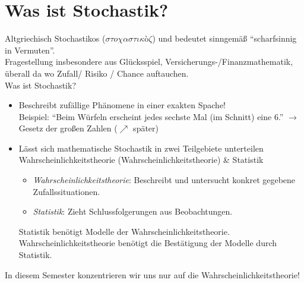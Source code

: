 \chapter*{Was ist Stochastik?}

Altgriechisch Stochastikos ($\sigma \tau o \chi \alpha \sigma \tau \iota \kappa$\`{o}$ \zeta$) und bedeutet sinngemäß ``scharfsinnig in Vermuten''.\\
Fragestellung insbesondere aus Glücksspiel, Versicherungs-/Finanzmathematik, überall da wo Zufall/ Risiko / Chance auftauchen.\\
Was ist Stochastik?
\begin{itemize}
	\item Beschreibt zufällige Phänomene in einer exakten Spache!\\
	Beispiel: ``Beim Würfeln erscheint jedes sechste Mal (im Schnitt) eine 6.'' $\longrightarrow$ Gesetz der großen Zahlen ($\nearrow$ später) %
	\item Lässt sich mathematische Stochastik in zwei Teilgebiete unterteilen\\
	Wahrscheinlichkeitstheorie (Wahrscheinlichkeitstheorie) \& Statistik
	\begin{itemize}
		\item \textit{Wahrscheinlichkeitstheorie}: Beschreibt und untersucht konkret gegebene Zufallssituationen.
		\item \textit{Statistik}: Zieht Schlussfolgerungen aus Beobachtungen.
	\end{itemize}
	Statistik benötigt Modelle der Wahrscheinlichkeitstheorie. Wahrscheinlichkeitstheorie benötigt die Bestätigung der Modelle durch Statistik.
\end{itemize}
In diesem Semester konzentrieren wir uns nur auf die Wahrscheinlichkeitstheorie!